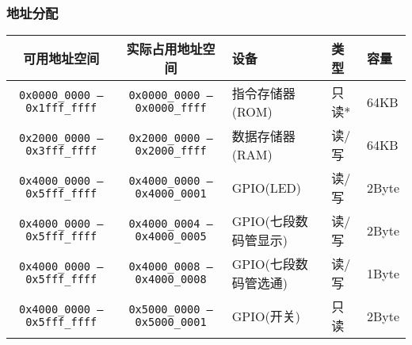 \documentclass[lang=cn,11pt,a4paper,chinesefont=founder]{elegantpaper}
\begin{document}
\subsubsection{地址分配}
\begin{table}[h!]
    \centering
    \begin{tabular}{cclll}
        \toprule
        可用地址空间 & 实际占用地址空间 & 设备 & 类型 & 容量\\
        \midrule
        \texttt{0x0000\_0000 --- 0x1fff\_ffff} & \texttt{0x0000\_0000 --- 0x0000\_ffff} & 指令存储器(ROM) & 只读* & 64KB\\
        \texttt{0x2000\_0000 --- 0x3fff\_ffff} & \texttt{0x2000\_0000 --- 0x2000\_ffff} & 数据存储器(RAM) & 读/写 & 64KB\\
        \texttt{0x4000\_0000 --- 0x5fff\_ffff} & \texttt{0x4000\_0000 --- 0x4000\_0001} & GPIO(LED)       & 读/写 & 2Byte \\
        \texttt{0x4000\_0000 --- 0x5fff\_ffff} & \texttt{0x4000\_0004 --- 0x4000\_0005} & GPIO(七段数码管显示) & 读/写 & 2Byte \\
        \texttt{0x4000\_0000 --- 0x5fff\_ffff} & \texttt{0x4000\_0008 --- 0x4000\_0008} & GPIO(七段数码管选通) & 读/写 & 1Byte \\
        \texttt{0x4000\_0000 --- 0x5fff\_ffff} & \texttt{0x5000\_0000 --- 0x5000\_0001} & GPIO(开关)       & 只读  & 2Byte \\
        \bottomrule
    \end{tabular}
\end{table}
\end{document}
